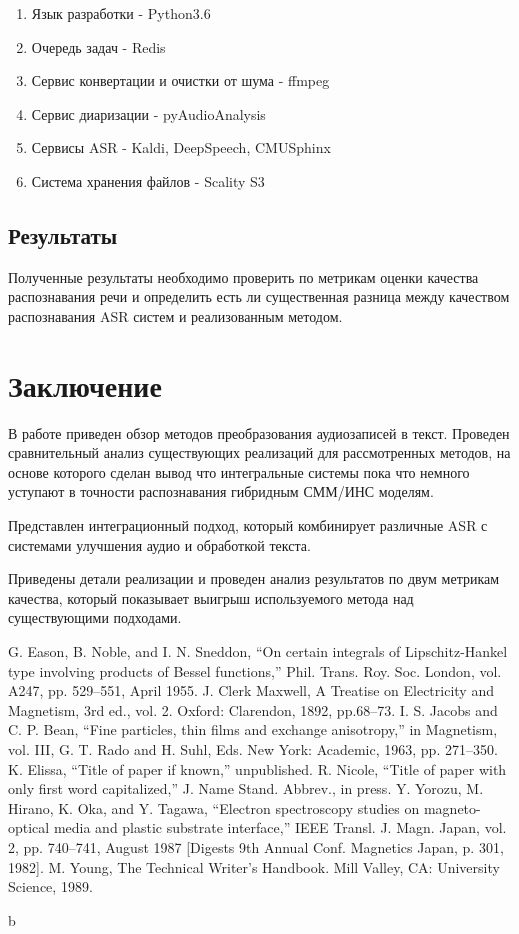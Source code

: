 \documentclass[conference]{IEEEtran}
\begin{document}
\begin{enumerate}
\item Язык разработки - Python3.6
\item Очередь задач - Redis
\item Сервис конвертации и очистки от шума - ffmpeg
\item Сервис диаризации - pyAudioAnalysis
\item Сервисы ASR - Kaldi, DeepSpeech, CMUSphinx
\item Система хранения файлов - Scality S3
\end{enumerate}


\subsection{Результаты}

Полученные результаты необходимо проверить по метрикам оценки качества распознавания речи и определить есть ли существенная разница между качеством распознавания ASR систем и реализованным методом.

\section{Заключение}
В работе приведен обзор методов преобразования аудиозаписей в текст. Проведен сравнительный анализ существующих реализаций для рассмотренных методов, на основе которого сделан вывод что интегральные системы пока что немного уступают в точности распознавания гибридным СММ/ИНС моделям.

Представлен интеграционный подход, который комбинирует различные ASR с системами улучшения аудио и обработкой текста.

Приведены детали реализации и проведен анализ результатов по двум метрикам качества, который показывает выигрыш используемого метода над существующими подходами.


\begin{thebibliography}{00}
 G. Eason, B. Noble, and I. N. Sneddon, ``On certain integrals of Lipschitz-Hankel type involving products of Bessel functions,'' Phil. Trans. Roy. Soc. London, vol. A247, pp. 529--551, April 1955.
 J. Clerk Maxwell, A Treatise on Electricity and Magnetism, 3rd ed., vol. 2. Oxford: Clarendon, 1892, pp.68--73.
 I. S. Jacobs and C. P. Bean, ``Fine particles, thin films and exchange anisotropy,'' in Magnetism, vol. III, G. T. Rado and H. Suhl, Eds. New York: Academic, 1963, pp. 271--350.
 K. Elissa, ``Title of paper if known,'' unpublished.
 R. Nicole, ``Title of paper with only first word capitalized,'' J. Name Stand. Abbrev., in press.
 Y. Yorozu, M. Hirano, K. Oka, and Y. Tagawa, ``Electron spectroscopy studies on magneto-optical media and plastic substrate interface,'' IEEE Transl. J. Magn. Japan, vol. 2, pp. 740--741, August 1987 [Digests 9th Annual Conf. Magnetics Japan, p. 301, 1982].
 M. Young, The Technical Writer's Handbook. Mill Valley, CA: University Science, 1989.
\end{thebibliography}
\vspace{12pt}b
\end{document}

